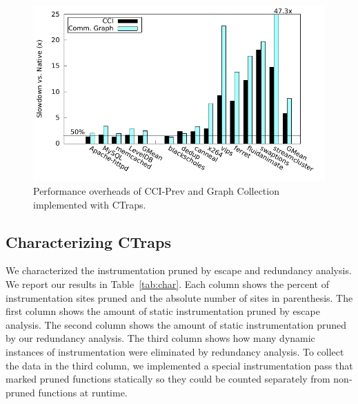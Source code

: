 \documentclass[preprint,9pt]{sigplanconf}
\newcommand{\addtodo}[1]{\textcolor{red}{[To do: #1]}}
\newcommand{\ctraps}{CTraps\xspace}
\begin{document}


\begin{figure}
\centering
\includegraphics[width=.9\columnwidth]{plots/appperf.pdf}
\caption{\label{fig:perfapps}Performance overheads of CCI-Prev and Graph Collection implemented with \ctraps.}
\end{figure}


\subsection{Characterizing \ctraps}
\label{sec:char}
We characterized the instrumentation pruned by escape and redundancy analysis.
We report our results in Table~\ref{tab:char}.  Each column shows the percent
of instrumentation sites pruned and the absolute number of sites in
parenthesis.  The first column shows the amount of static instrumentation
pruned by escape analysis.  The second column shows the amount of static
instrumentation pruned by our redundancy analysis.  The third column shows how
many dynamic instances of instrumentation were eliminated by redundancy analysis.  To
collect the data in the third column, we implemented a special instrumentation
pass that marked pruned functions statically so they could be counted
separately from non-pruned functions at runtime.
\end{document}
